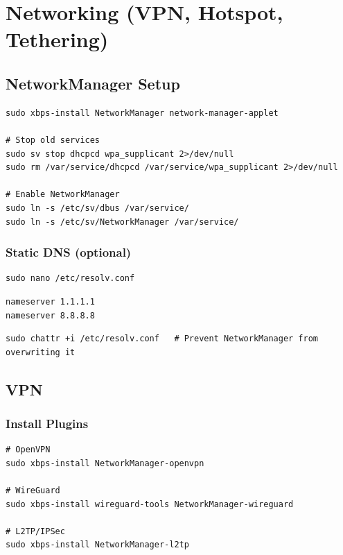 \documentclass[12pt, a4paper]{book}
\begin{document}
\chapter{Networking (VPN, Hotspot, Tethering)}

\section{NetworkManager Setup}
\begin{lstlisting}
sudo xbps-install NetworkManager network-manager-applet

# Stop old services
sudo sv stop dhcpcd wpa_supplicant 2>/dev/null
sudo rm /var/service/dhcpcd /var/service/wpa_supplicant 2>/dev/null

# Enable NetworkManager
sudo ln -s /etc/sv/dbus /var/service/
sudo ln -s /etc/sv/NetworkManager /var/service/
\end{lstlisting}

\subsection{Static DNS (optional)}
\begin{lstlisting}
sudo nano /etc/resolv.conf
\end{lstlisting}
\begin{lstlisting}
nameserver 1.1.1.1
nameserver 8.8.8.8
\end{lstlisting}
\begin{lstlisting}
sudo chattr +i /etc/resolv.conf   # Prevent NetworkManager from overwriting it
\end{lstlisting}

\section{VPN}

\subsection{Install Plugins}
\begin{lstlisting}
# OpenVPN
sudo xbps-install NetworkManager-openvpn

# WireGuard
sudo xbps-install wireguard-tools NetworkManager-wireguard

# L2TP/IPSec
sudo xbps-install NetworkManager-l2tp
\end{lstlisting}
\end{document}
